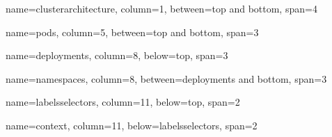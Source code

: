 \documentclass[8pt]{extarticle}
\begin{document}
\begin{tcbposter}[
        poster = {spacing=0.6em, columns=12, height=\textheight},
        boxes = {},
        coverage={left=0pt, right=0pt, top=0pt, bottom=0pt},
    ]

    \begin{posterboxenv}[skin=cheatboxskin, adjusted title=Cluster Architecture]
        {name=clusterarchitecture, column=1, between=top and bottom, span=4}
        
    \end{posterboxenv}

    \begin{posterboxenv}[skin=cheatboxskin, adjusted title={Pods}]
        {name=pods, column=5, between=top and bottom, span=3}
        
    \end{posterboxenv}

    \begin{posterboxenv}[skin=cheatboxskin, adjusted title={Deployments}]
        {name=deployments, column=8, below=top, span=3}
        
    \end{posterboxenv}

    \begin{posterboxenv}[skin=cheatboxskin, adjusted title={Namespaces}]
        {name=namespaces, column=8, between=deployments and bottom, span=3}
        
    \end{posterboxenv}


    \begin{posterboxenv}[skin=cheatboxskin, adjusted title={Labels \& Selectors}]
        {name=labelsselectors, column=11, below=top, span=2}
        
    \end{posterboxenv}

    \begin{posterboxenv}[skin=cheatboxskin, adjusted title={Context}]
        {name=context, column=11, below=labelsselectors, span=2}
        
    \end{posterboxenv}


\end{tcbposter}
\end{document}
